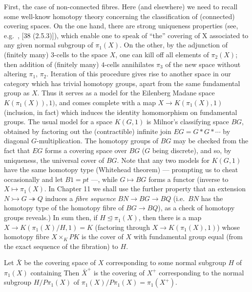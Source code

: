 First, the case of non-connected fibres. Here (and elsewhere) we need to recall some well-know homotopy theory concerning the classification of (connected) covering spaces. On the one hand, there are strong uniqueness properties (see, e.g.\ , [38 (2.5.3)]), which enable one to speak of ``the'' covering of X associated to any given normal subgroup of $\pi_1 (X)$. On the other, by the adjunction of (finitely many) $3$-cells to the space $X$, one can kill off all elements of $\pi_2(X)$; then addition of (finitely many) $4$-cells annihilates $\pi_3$ of the new space without altering $\pi_1$, $\pi_2$. Iteration of this procedure gives rise to another space in our category which has trivial homotopy groups, apart from the same fundamental group as $X$. Thus it serves as a model for the Eilenberg Madane space $K(\pi_1(X)), 1)$, and comes complete with a map $X \longrightarrow K(\pi_1(X), 1)$ (inclusion, in fact) which induces the identity homomorphism on fundamental groups. The usual model for a space $K(G, 1)$ is Milnor's classifying space $BG$, obtained by factoring out the (contractible) infinite join $EG = G*G*\cdots$ by diagonal $G$-multiplication. The homotopy groups of $BG$ may be checked from the fact that $EG$ forms a covering space over $BG$ ($G$ being discrete), and so, by uniqueness, the universal cover of $BG$. Note that any two models for $K(G, 1)$ have the same homotopy type (Whitehead theorem) --- prompting us to cheat occasionally and let $B1 = pt$ ---, while $G \mapsto BG$ forms a functor (inverse to $X\mapsto \pi_1(X)$. In Chapter 11 we shall use the further
property that an extension $N\rightarrowtail G \twoheadrightarrow Q$ induces a {\em fibre sequence} $BN \longrightarrow BG \longrightarrow BQ$ (i.e.\  $BN$ has the homotopy type of the homotopy fibre of $BG\longrightarrow BQ$), as a check of homotopy groups reveals.) In sum then, if $H \unlhd \pi_1 (X)$, then there is a map $X \longrightarrow K(\pi_1(X)/H, 1) = K$ (factoring
through $X\longrightarrow K(\pi_1(X), 1)$) whose homotopy fibre $X \times_K PK$ is the cover of $X$ with fundamental group equal (from the exact sequence of the fibration) to $H$.
\begin{prop}
  Let $\bar{X}$ be the covering space of $X$ corresponding to some normal subgroup $H$ of $\pi_1(X)$ containing Then $\bar{X}^+$ is the covering of $X^+$ corresponding to the
normal subgroup $H/P\pi_1(X)$ of $\pi_1(X)/P\pi_1(X) = \pi_1(X^+)$.
\end{prop}
